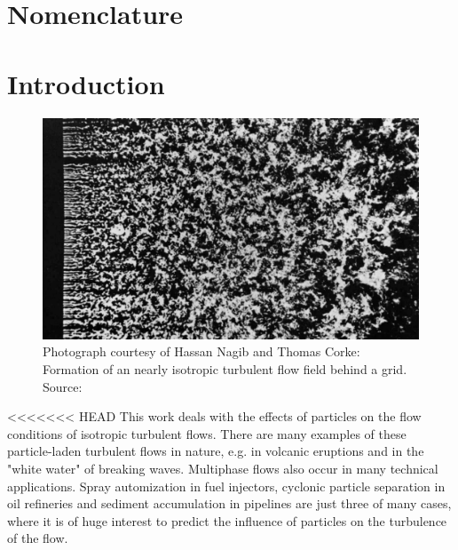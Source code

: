 \documentclass[11pt,a4paper,openany,oneside,parskip=half*]{article}
\begin{document}
\makenomenclature %


\renewcommand{\refname}{}
\renewcommand{\nomname}{}



\setlength{\columnsep}{30pt}
\setlength{\parindent}{0pt}

\pagebreak

\tableofcontents{} %
 
\pagebreak

\section{Nomenclature}
\printnomenclature
\pagebreak
\section{Introduction}
\begin{figure}[h]
	\centering
  \includegraphics[width=\textwidth]{./Abbildungen/TurbulentMotion_Introduction.png}
	\caption{Photograph courtesy of Hassan Nagib and Thomas Corke: Formation of an nearly isotropic turbulent flow field behind a grid. Source: \cite{albumOfTurbulentMotion}}
	\label{introduction_picture}
\end{figure}
<<<<<<< HEAD
This work deals with the effects of particles on the flow conditions of isotropic turbulent flows.
There are many examples of these particle-laden turbulent flows in nature, e.g. in volcanic eruptions and in the "white water" of breaking waves.
\newline
Multiphase flows also occur in many technical applications. Spray automization in fuel injectors, cyclonic particle separation in oil refineries and sediment accumulation in pipelines are just three of many cases, where it is of huge interest to predict the influence of particles on the turbulence of the flow.
\end{document}
